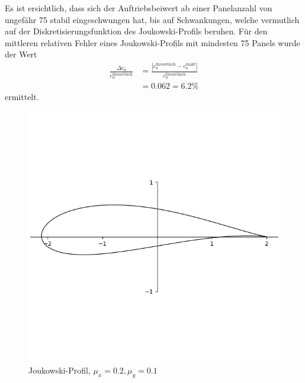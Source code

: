 Es ist ersichtlich, dass sich der Auftriebsbeiwert ab einer Panelanzahl von ungefähr 75 stabil eingeschwungen hat, bis auf Schwankungen, welche vermutlich auf der Diskretisierungsfunktion des Joukowski-Profils beruhen. Für den mittleren relativen Fehler eines Joukowski-Profils mit mindesten 75 Panels wurde der Wert
\begin{align*}
\frac{\Delta c_a}{c_a^\mathrm{theoretisch}} &= \frac{|c_a^\mathrm{theoretisch} - c_a^\mathrm{exakt}|}{c_a^\mathrm{theoretisch}} \\
& = 0.062 = 6.2 \%
\end{align*}
ermittelt. \cite{Abello2018} \cite{Barba:2019}
\begin{figure}[!ht]
\begin{center} \includegraphics[scale=0.3]{figures/jouk0201.png} \end{center}
\caption{Joukowski-Profil, $\mu_x = 0.2, \mu_y =0.1$}
\label{fig:jouk0201}
\end{figure}